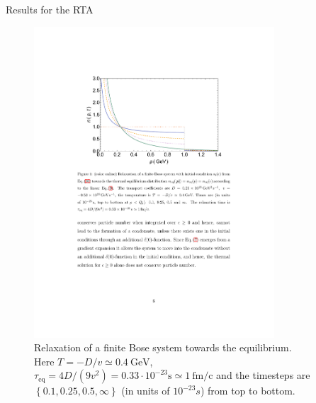 \begin{frame}{Results for the RTA}
\begin{figure}[H]
\centering
\includegraphics[width=0.8\textwidth]{figures/rta}
\caption{Relaxation of a finite Bose system towards the equilibrium. \cite{Wolschin2018} \\ 
Here $T = -D/v \simeq 0.4\ \mathrm{GeV}$, $\tau_{\mathrm{eq}} = 4D/(9v^2) = 0.33\cdot 10^{-23} \mathrm{s} \simeq 1\ \mathrm{fm/c}$ and the timesteps are $\left\{0.1, 0.25, 0.5,\infty\right\}$ (in units of $10^{-23}s$) from top to bottom.}
\end{figure}
\end{frame}

